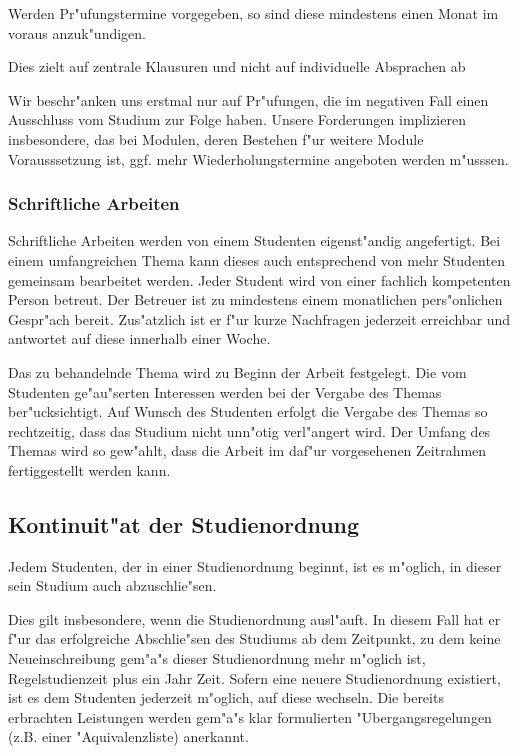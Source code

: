 Werden Pr"ufungstermine vorgegeben, so sind diese mindestens einen Monat im voraus
anzuk"undigen.
\begin{kcmt}\begin{komacmt}
	Dies zielt auf zentrale Klausuren und nicht 
	auf individuelle Absprachen ab

	Wir beschr"anken uns erstmal nur auf Pr"ufungen, die im negativen Fall 
	einen Ausschluss vom Studium zur Folge haben.  Unsere Forderungen implizieren 
	insbesondere, das bei Modulen, deren Bestehen f"ur weitere Module Vorausssetzung 
	ist, ggf. mehr Wiederholungstermine angeboten werden m"usssen. 
\end{komacmt}\end{kcmt}

\subsubsection{Schriftliche Arbeiten}

Schriftliche Arbeiten werden von einem Studenten eigenst"andig angefertigt.
Bei einem umfangreichen Thema kann dieses auch entsprechend von mehr Studenten gemeinsam bearbeitet werden.
Jeder Student wird von einer fachlich kompetenten Person betreut.
Der Betreuer ist zu mindestens einem monatlichen pers"onlichen Gespr"ach bereit.
Zus"atzlich ist er f"ur kurze Nachfragen jederzeit erreichbar und antwortet auf diese innerhalb einer Woche.

Das zu behandelnde Thema wird zu Beginn der Arbeit festgelegt.
Die vom Studenten ge"au"serten Interessen werden bei der Vergabe des Themas ber"ucksichtigt.
Auf Wunsch des Studenten erfolgt die Vergabe des Themas so rechtzeitig, dass das Studium nicht unn"otig verl"angert wird.
Der Umfang des Themas wird so gew"ahlt, dass die Arbeit im daf"ur vorgesehenen Zeitrahmen fertiggestellt werden kann.


\subsection{Kontinuit"at der Studienordnung}

Jedem Studenten, der in einer Studienordnung beginnt, ist es m"oglich, in dieser sein Studium auch abzuschlie"sen.

Dies gilt insbesondere, wenn die Studienordnung ausl"auft.
In diesem Fall hat er f"ur das erfolgreiche Abschlie"sen des Studiums ab dem Zeitpunkt, zu dem keine Neueinschreibung gem"a"s dieser Studienordnung mehr m"oglich ist, Regelstudienzeit plus ein Jahr Zeit.
Sofern eine neuere Studienordnung existiert, ist es dem Studenten jederzeit m"oglich, auf diese wechseln.
Die bereits erbrachten Leistungen werden gem"a"s klar formulierten "Ubergangsregelungen (z.B. einer "Aquivalenzliste) anerkannt.

